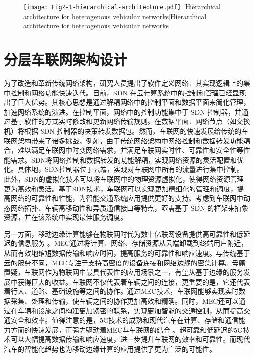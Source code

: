 \begin{figure}[h] 
	\centering
	\texttt{[image: Fig2-1-hierarchical-architecture.pdf]}
	[Hierarchical architecture for heterogenous vehicular networks]{Hierarchical architecture for heterogenous vehicular networks}
	\label{fig 2-1}
\end{figure}

\section{分层车联网架构设计}\label{section 2-2}

为了改造和革新传统网络架构，研究人员提出了软件定义网络\cite{wang2020ji}，其实现逻辑上的集中控制和网络功能快速迭代。目前，SDN 在云计算系统中的控制和管理已经显现出了巨大优势\cite{jain2013network}。其核心思想是通过解耦网络中的控制平面和数据平面来简化管理，加速网络系统的演进。在控制平面，网络中的控制功能集中于 SDN 控制器，并通过基于软件的方式实时修改和更新网络传输规则。在数据平面，网络节点（如交换机）将根据 SDN 控制器的决策转发数据包。然而，车联网的快速发展给传统的车联网架构带来了诸多挑战。例如，由于传统网络架构中网络控制和数据转发功能耦合，难以满足车联网中时变网络需求，并满足车联网实时性、可靠性和安全性等性能需求。SDN将网络控制和数据转发的功能解耦，实现网络资源的灵活配置和优化。具体地，SDN控制器位于云端，实现对车联网中所有的流量进行集中控制。此外，SDN的虚拟化技术可以将车联网中的物理资源虚拟化，使得网络资源管理更为高效和灵活。基于SDN技术，车联网可以实现更加精细化的管理和调度，提高网络的可靠性和性能，为智能交通系统应用提供更好的支持。考虑到车联网中动态网络拓扑、车辆高移动性和异质通信接口等特点，亟需基于 SDN 的框架来抽象资源，并在该系统中实现最佳服务调度。

另一方面，移动边缘计算能够在物联网时代为数十亿联网设备提供高可靠性和低延迟的信息服务 \cite{shi2016edge}。MEC通过将计算、网络、存储资源从云端卸载到终端用户附近，从而有效地缩短数据传输和响应时间，提高服务的可靠性和响应速度。与传统基于云的服务不同，MEC专注于支持高密度的设备连接和网络边缘的密集计算。毋庸置疑，车联网作为物联网中最具代表性的应用场景之一，有望从基于边缘的服务发展中获得巨大的收益。车联网不仅代表着车辆之间的连接，更重要的是，它还代表着行人、道路、基础设施等之间的协作。通过MEC技术，车联网能够实现实时数据采集、处理和传输，使车辆之间的协作更加高效和精确。同时，MEC还可以通过在车辆和设施之间构建更加紧密的联系，实现更加智能的交通控制，从而提高交通安全和效率。值得注意的是，5G技术的成熟和现代汽车在计算、存储和通信能力方面的快速发展，正强力驱动着MEC与车联网的结合 \cite{li2021che}。超可靠和低延迟的5G技术可以大幅提高数据传输和响应速度，进一步提升车联网的效率和可靠性。而现代汽车的智能化趋势也为移动边缘计算的应用提供了更为广泛的可能性。


